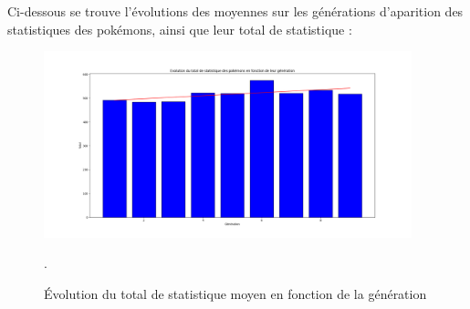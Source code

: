 \documentclass[a4paper,12pt]{article}
\begin{document}
Ci-dessous se trouve l'évolutions des moyennes sur les générations d'aparition
des statistiques des pokémons, ainsi que leur total de statistique :

\begin{figure}[!h]
    \centering
    \includegraphics[width=0.95\textwidth]{Image/Total_avg.png}
    \caption{Évolution du total de statistique moyen en fonction de la
    génération}.
    \label{fig:image3}
\end{figure}
\end{document}
